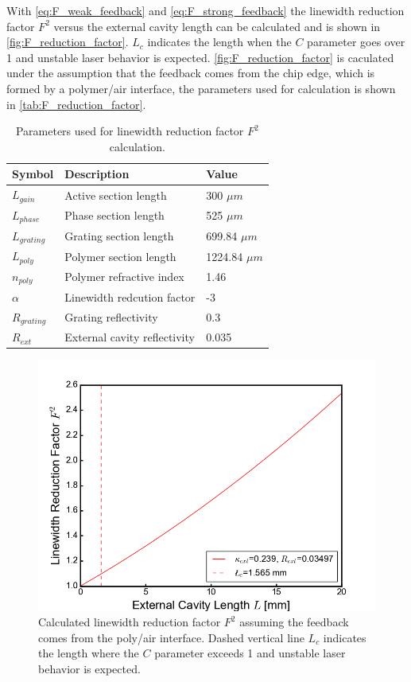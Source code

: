 With \autoref{eq:F_weak_feedback} and \autoref{eq:F_strong_feedback} the linewidth reduction factor $F^2$ versus the external cavity length can be calculated and is shown in \autoref{fig:F_reduction_factor}. $L_c$ indicates the length when the $C$ parameter goes over 1 and unstable laser behavior is expected. \autoref{fig:F_reduction_factor} is caculated under the assumption that the feedback comes from the chip edge, which is formed by a polymer/air interface, the parameters used for calculation is shown in \autoref{tab:F_reduction_factor}.

\begin{table}[ht]
    \centering
    \caption{Parameters used for linewidth reduction factor $F^2$ calculation.}
    \begin{tabular}{@{}lll@{}}
    \toprule
    Symbol        & Description                  & Value           \\ \midrule
    $L_{gain}$    & Active section length        & 300 $\mu m$     \\
    $L_{phase}$   & Phase section length         & 525 $\mu m$     \\
    $L_{grating}$ & Grating section length       & 699.84 $\mu m$  \\
    $L_{poly}$    & Polymer section length       & 1224.84 $\mu m$ \\
    $n_{poly}$    & Polymer refractive index     & 1.46            \\
    $\alpha$      & Linewidth redcution factor   & -3              \\
    $R_{grating}$ & Grating reflectivity         & 0.3             \\
    $R_{ext}$     & External cavity reflectivity & 0.035           \\ \bottomrule
    \end{tabular}
    \label{tab:F_reduction_factor}
\end{table}

\begin{figure}[ht]
    \centering
    \includegraphics[width=.7\linewidth]{figures/F_reduction_factor.png}
    \caption{Calculated linewidth reduction factor $F^2$ assuming the feedback comes from the poly/air interface. Dashed vertical line $L_c$ indicates the length where the $C$ parameter exceeds 1 and unstable laser behavior is expected.}
    \label{fig:F_reduction_factor}
\end{figure}

